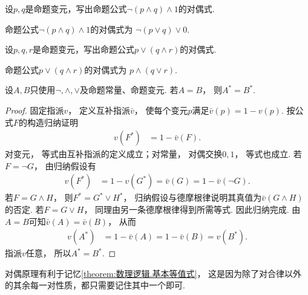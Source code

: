 \begin{example}
设\(p,q\)是命题变元，写出命题公式\(\neg(p \land q) \land 1\)的对偶式.
\begin{solution}
命题公式\(\neg(p \land q) \land 1\)的对偶式为
\(\neg(p \lor q) \lor 0\).
\end{solution}
\end{example}

\begin{example}
设\(p,q,r\)是命题变元，写出命题公式\(p \lor (q \land r)\)的对偶式.
\begin{solution}
命题公式\(p \lor (q \land r)\)的对偶式为
\(p \land (q \lor r)\).
\end{solution}
\end{example}

\begin{theorem}[对偶原理]
    设\(A,B\)只使用\(\neg,\land,\lor\)及命题常量、命题变元.
    若\(A=B\)，
    则\(A^*=B^*\).
    \begin{proof}
        固定指派\(v\)，
        定义互补指派\(\bar v\)，
        使每个变元\(p\)满足\(\bar v(p)=1-v(p)\).
        按公式\(F\)的构造归纳证明
        \begin{align*}
            v(F^*) &= 1-\bar v(F).
        \end{align*}
        对变元，
        等式由互补指派的定义成立；对常量，
        对偶交换\(0,1\)，
        等式也成立.
        若\(F=\neg G\)，
        由归纳假设有
        \begin{align*}
            v(F^*) &= 1-v(G^*)=\bar v(G)=1-\bar v(\neg G).
        \end{align*}
        若\(F=G\land H\)，
        则\(F^*=G^*\lor H^*\)，
        归纳假设与德摩根律说明其真值为\(\bar v(G\land H)\)的否定.
        若\(F=G\lor H\)，
        同理由另一条德摩根律得到所需等式.
        因此归纳完成.
        由\(A=B\)可知\(\bar v(A)=\bar v(B)\)，
        从而
        \begin{align*}
            v(A^*) &= 1-\bar v(A)=1-\bar v(B)=v(B^*).
        \end{align*}
        指派\(v\)任意，
        所以\(A^*=B^*\).
    \end{proof}
\end{theorem}

对偶原理有利于记忆\cref{theorem:数理逻辑.基本等值式}，
这是因为除了对合律以外的其余每一对性质，都只需要记住其中一个即可.

